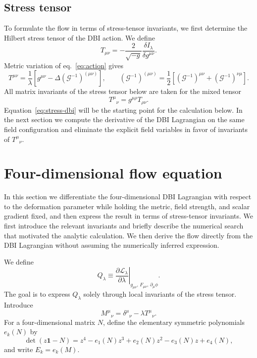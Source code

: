 \documentclass[a4paper,11pt]{article}
\numberwithin{equation}{section}
\newcommand{\Lag}{\mathcal L}
\newcommand{\G}{\mathcal G}
\newcommand{\Id}{\mathbf 1}
\begin{document}
\subsection{Stress tensor}

To formulate the flow in terms of stress-tensor invariants, we first determine the Hilbert stress tensor of the DBI action. We define
\begin{equation}
 T_{\mu\nu}
 =-\frac{2}{\sqrt{-g}}\frac{\delta I_\lambda}{\delta g^{\mu\nu}}.
 \label{eq:stress-definition}
\end{equation}
Metric variation of eq.~\eqref{eq:action} gives
\begin{equation}
 T^{\mu\nu}
 =\frac1\lambda
 \left[g^{\mu\nu}-\Delta(\G^{-1})^{(\mu\nu)}\right],
 \qquad
 (\G^{-1})^{(\mu\nu)}
 =\frac12\left[(\G^{-1})^{\mu\nu}+(\G^{-1})^{\nu\mu}\right].
 \label{eq:stress-dbi}
\end{equation}
All matrix invariants of the stress tensor below are taken for the mixed tensor
\begin{equation}
 T^\mu{}_{\nu}=g^{\mu\rho}T_{\rho\nu}.
 \label{eq:mixed-T}
\end{equation}
Equation~\eqref{eq:stress-dbi} will be the starting point for the calculation below. In the next section we compute the derivative of the DBI Lagrangian on the same field configuration and eliminate the explicit field variables in favor of invariants of $T^\mu{}_{\nu}$.

\section{Four-dimensional flow equation}
\label{sec:flow}

In this section we differentiate the four-dimensional DBI Lagrangian with respect to the deformation parameter while holding the metric, field strength, and scalar gradient fixed, and then express the result in terms of stress-tensor invariants. We first introduce the relevant invariants and briefly describe the numerical search that motivated the analytic calculation. We then derive the flow directly from the DBI Lagrangian without assuming the numerically inferred expression.

We define
\begin{equation}
 Q_\lambda\equiv
 \left.\frac{\partial\Lag_\lambda}{\partial\lambda}\right|_{g_{\mu\nu},\,F_{\mu\nu},\,\partial_\mu\phi}.
 \label{eq:Q-definition}
\end{equation}
The goal is to express $Q_\lambda$ solely through local invariants of the stress tensor. Introduce
\begin{equation}
 M^\mu{}_{\nu}=\delta^\mu{}_{\nu}-\lambda T^\mu{}_{\nu}.
 \label{eq:M-definition}
\end{equation}
For a four-dimensional matrix $N$, define the elementary symmetric polynomials $e_k(N)$ by
\begin{equation}
 \det(z\Id-N)
 =z^4-e_1(N)z^3+e_2(N)z^2-e_3(N)z+e_4(N),
 \label{eq:elementary-definition}
\end{equation}
and write $E_k=e_k(M)$.
\end{document}
